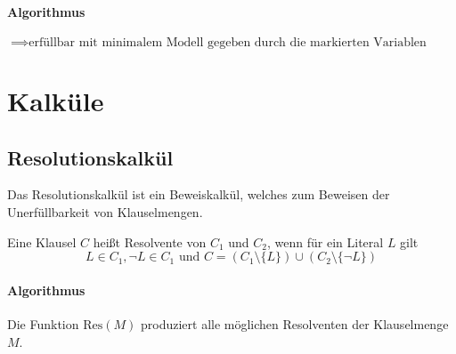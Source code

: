 \documentclass[a4paper, 11pt, accentcolor = tud3b]{tudreport}
\begin{document}
                \paragraph{Algorithmus}
                    \begin{algorithm}[H]

                        $ \implies \text{erfüllbar mit minimalem Modell gegeben durch die markierten Variablen} $
                    \end{algorithm}

        \section{Kalküle}
            \subsection{Resolutionskalkül}
                \label{subsec:reso}

                Das Resolutionskalkül ist ein Beweiskalkül, welches zum Beweisen der Unerfüllbarkeit von Klauselmengen.

                Eine Klausel $ C $ heißt Resolvente von $ C _ 1 $ und $ C _ 2 $, wenn für ein Literal $ L $ gilt \[ L \in C _ 1, \lnot L \in C _ 1 \text{ und } C = (C _ 1 \setminus \{ L \}) \cup (C _ 2 \setminus \{ \lnot L \}) \]

                \paragraph{Algorithmus}
                    Die Funktion $ \text{Res}(M) $ produziert alle möglichen Resolventen der Klauselmenge $ M $.
\end{document}
